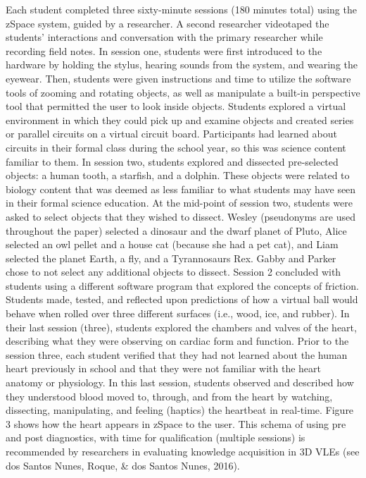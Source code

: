 \documentclass[11.5pt]{sig-alternate} %
\begin{document}
\begin{large}
Each student completed three sixty-minute sessions (180 minutes total) using the zSpace system, guided by a researcher. A second researcher videotaped the students’ interactions and conversation with the primary researcher while recording field notes. In session one, students were first introduced to the hardware by holding the stylus, hearing sounds from the system, and wearing the eyewear. Then, students were given instructions and time to utilize the software tools of zooming and rotating objects, as well as manipulate a built-in perspective tool that permitted the user to look inside objects. Students explored a virtual environment in which they could pick up and examine objects and created series or parallel circuits on a virtual circuit board. Participants had learned about circuits in their formal class during the school year, so this was science content familiar to them. In session two, students explored and dissected pre-selected objects: a human tooth, a starfish, and a dolphin. These objects were related to biology content that was deemed as less familiar to what students may have seen in their formal science education. At the mid-point of session two, students were asked to select objects that they wished to dissect. Wesley (pseudonyms are used throughout the paper) selected a dinosaur and the dwarf planet of Pluto, Alice selected an owl pellet and a house cat (because she had a pet cat), and Liam selected the planet Earth, a fly, and a Tyrannosaurs Rex. Gabby and Parker chose to not select any additional objects to dissect. Session 2 concluded with students using a different software program that explored the concepts of friction. Students made, tested, and reflected upon predictions of how a virtual ball would behave when rolled over three different surfaces (i.e., wood, ice, and rubber). In their last session (three), students explored the chambers and valves of the heart, describing what they were observing on cardiac form and function. Prior to the session three, each student verified that they had not learned about the human heart previously in school and that they were not familiar with the heart anatomy or physiology. In this last session, students observed and described how they understood blood moved to, through, and from the heart by watching, dissecting, manipulating, and feeling (haptics) the heartbeat in real-time. Figure 3 shows how the heart appears in zSpace to the user. This schema of using pre and post diagnostics, with time for qualification (multiple sessions) is recommended by researchers in evaluating knowledge acquisition in 3D VLEs (see dos Santos Nunes, Roque, \& dos Santos Nunes, 2016). 


\end{large}
\end{document}
